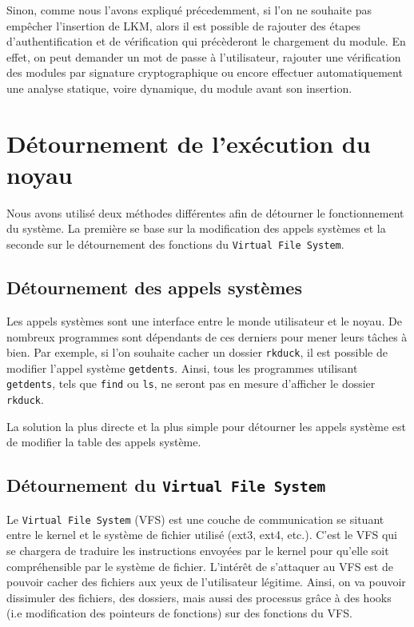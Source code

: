 \documentclass[11pt]{article}
\begin{document}
        Sinon, comme nous l'avons expliqué précedemment, si l'on ne souhaite pas empêcher l'insertion de LKM, alors il est possible de rajouter des étapes d'authentification et de vérification qui précèderont le chargement du module. En effet, on peut demander un mot de passe à l'utilisateur, rajouter une vérification des modules par signature cryptographique ou encore effectuer automatiquement une analyse statique, voire dynamique, du module avant son insertion.
    
\section{Détournement de l'exécution du noyau}  

Nous avons utilisé deux méthodes différentes afin de détourner le fonctionnement du système. La première se base sur la modification des appels systèmes et la seconde sur le détournement des fonctions du \texttt{Virtual File System}.

    \subsection{Détournement des appels systèmes}
    
        Les appels systèmes sont une interface entre le monde utilisateur et le noyau. De nombreux programmes sont dépendants de ces derniers pour mener leurs tâches à bien. Par exemple, si l'on souhaite cacher un dossier \texttt{rkduck}, il est possible de modifier l'appel système \texttt{getdents}. Ainsi, tous les programmes utilisant \texttt{getdents}, tels que \texttt{find} ou \texttt{ls}, ne seront pas en mesure d'afficher le dossier \texttt{rkduck}.

        La solution la plus directe et la plus simple pour détourner les appels système est de modifier la table des appels système.

    \subsection{Détournement du \texttt{Virtual File System}}
    \label{sec:vfs}
    
        Le \texttt{Virtual File System} (VFS) est une couche de communication se situant entre le kernel et le système de fichier utilisé (ext3, ext4, etc.). C'est le VFS qui se chargera de traduire les instructions envoyées par le kernel pour qu'elle soit compréhensible par le système de fichier.
        L'intérêt de s'attaquer au VFS est de pouvoir cacher des fichiers aux yeux de l'utilisateur légitime. Ainsi, on va pouvoir dissimuler des fichiers, des dossiers, mais aussi des processus grâce à des hooks (i.e modification des pointeurs de fonctions) sur des fonctions du VFS. \\
\end{document}
